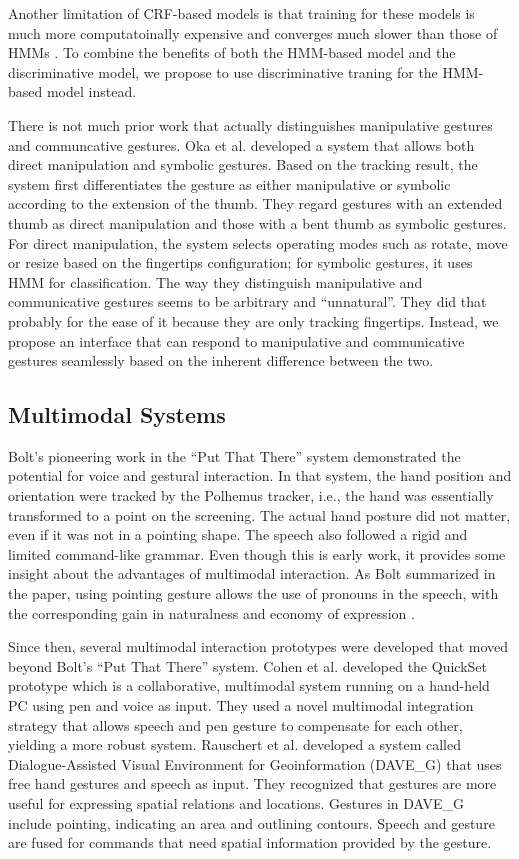 Another limitation of CRF-based models is that training for these models is much
more computatoinally expensive and converges much slower than those of HMMs 
\cite{lafferty01}. To combine the benefits of both the HMM-based model and the 
discriminative model, we propose to use discriminative traning for the HMM-based
model instead.

There is not much prior work that actually distinguishes manipulative gestures
and communcative gestures. Oka et al. \cite{Oka02} developed a system that allows
both direct manipulation and symbolic gestures. Based on the tracking result,
the system first differentiates the gesture as either manipulative or symbolic 
according to the extension of the thumb. They regard gestures with an extended 
thumb as direct manipulation and those with a bent thumb as symbolic gestures. 
For direct manipulation, the system selects operating modes such as rotate, 
move or resize based on the fingertips configuration; for symbolic gestures, it 
uses HMM for classification. The way they distinguish manipulative and 
communicative gestures seems to be arbitrary and ``unnatural''. They did that 
probably for the ease of it because they are only tracking fingertips.
Instead, we propose an interface that can respond to manipulative and
communicative gestures seamlessly based on the inherent difference between the two.

\subsection{Multimodal Systems}
Bolt's pioneering work in the ``Put That There'' system \cite{Bolt80} 
demonstrated the potential for voice and gestural interaction.  In that system, 
the hand position and orientation were tracked by the Polhemus tracker, i.e.,
the hand was essentially transformed to a point on the screening. The actual hand 
posture did not matter, even if it was not in a pointing shape. The speech also 
followed a rigid and limited command-like grammar. Even though this is early 
work, it provides some insight about the advantages of multimodal interaction. 
As Bolt summarized in the paper, using pointing gesture allows the use of 
pronouns in the speech, with the corresponding gain in naturalness and economy 
of expression \cite{Bolt80}.

Since then, several multimodal interaction prototypes were 
developed that moved beyond Bolt's ``Put That There'' system. Cohen et al. 
\cite{Cohen97} developed the QuickSet prototype which is a collaborative, 
multimodal system running on a hand-held PC using pen and voice as input. They 
used a novel multimodal integration strategy that allows speech and pen gesture 
to compensate for each other, yielding a more robust system. Rauschert et al. 
\cite{Rauschert02} developed a system called Dialogue-Assisted Visual 
Environment for Geoinformation (DAVE\_G) that uses free hand gestures and speech
as input. They recognized that gestures are more useful for expressing spatial 
relations and locations. Gestures in DAVE\_G include pointing, indicating an 
area and outlining contours. Speech and gesture are fused for commands that need
spatial information provided by the gesture. 

